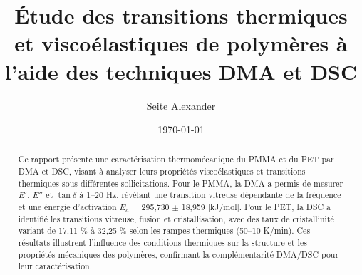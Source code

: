 \documentclass[letterpaper,12pt]{article}
\begin{document}
\title{Étude des transitions thermiques et viscoélastiques de polymères à l’aide des techniques DMA et DSC}
\author{Seite Alexander}
\date{\today}
\maketitle
\newline


\begin{abstract}
	Ce rapport présente une caractérisation thermomécanique du PMMA et du PET par DMA et DSC, visant à analyser leurs propriétés viscoélastiques et transitions thermiques sous différentes sollicitations. Pour le PMMA, la DMA a permis de mesurer $E'$, $E''$ et $\tan\delta$ à 1–20 Hz, révélant une transition vitreuse dépendante de la fréquence et une énergie d’activation $E_a$ = 295,730 $\pm$ 18,959 [kJ/mol]. Pour le PET, la DSC a identifié les transitions vitreuse, fusion et cristallisation, avec des taux de cristallinité variant de 17,11 \% à 32,25 \% selon les rampes thermiques (50–10 K/min). Ces résultats illustrent l’influence des conditions thermiques sur la structure et les propriétés mécaniques des polymères, confirmant la complémentarité DMA/DSC pour leur caractérisation.
\end{abstract}

\tableofcontents

\newpage


















\end{document}
